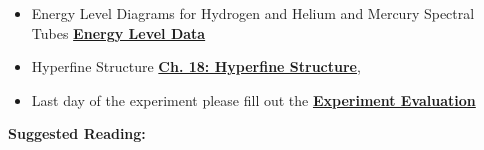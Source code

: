 \documentclass{../lab}
\begin{document}
\begin{enumerate}
\begin{itemize}
        \item Energy Level Diagrams for Hydrogen and Helium and Mercury Spectral Tubes \href{http://physics111.lib.berkeley.edu/Physics111/Reprints/ATM/ATM\_index.html}{\textbf{Energy Level Data}}
    
        \item Hyperfine Structure \href{http://physics111.lib.berkeley.edu/Physics111/Reprints/ATM/Introduction\%20to\%20Atomic\%20Harvey\%20E.\%20White/Ch.\%2018\%20hyperfine\%20structure\_OCR.pdf}{\textbf{Ch. 18: Hyperfine Structure}},
    
        \item Last day of the experiment please fill out the \href{\ExperimentEvaluation}{\textbf{Experiment Evaluation}}
    
    \end{itemize}
\end{enumerate}

\noindent\textbf{Suggested Reading:}
\end{document}
